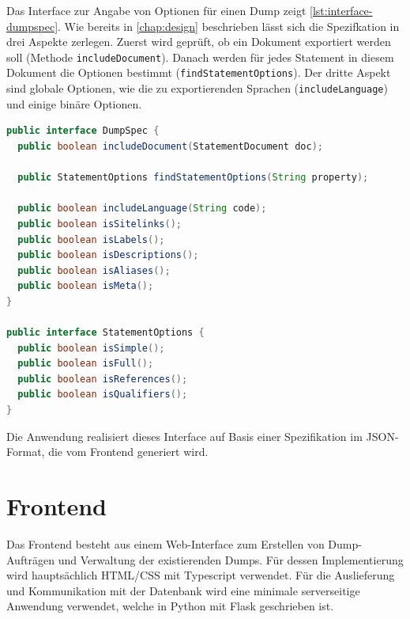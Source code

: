 Das Interface zur Angabe von Optionen für einen Dump zeigt \cref{lst:interface-dumpspec}.
Wie bereits in \cref{chap:design} beschrieben lässt sich die Spezifkation in drei Aspekte zerlegen.
Zuerst wird geprüft, ob ein Dokument exportiert werden soll (Methode \verb|includeDocument|).
Danach werden für jedes Statement in diesem Dokument die Optionen bestimmt (\verb|findStatementOptions|).
Der dritte Aspekt sind globale Optionen, wie die zu exportierenden Sprachen (\verb|includeLanguage|) und einige binäre Optionen.

\begin{lstlisting}[language=Java, caption={Interface für die Filterkriterien}, label={lst:interface-dumpspec}]
public interface DumpSpec {
  public boolean includeDocument(StatementDocument doc);

  public StatementOptions findStatementOptions(String property);

  public boolean includeLanguage(String code);
  public boolean isSitelinks();
  public boolean isLabels();
  public boolean isDescriptions();
  public boolean isAliases();
  public boolean isMeta();
}

public interface StatementOptions {
  public boolean isSimple();
  public boolean isFull();
  public boolean isReferences();
  public boolean isQualifiers();
}
\end{lstlisting}

Die Anwendung realisiert dieses Interface auf Basis einer Spezifikation im JSON-Format, die vom Frontend generiert wird. 

\section{Frontend}
Das Frontend besteht aus einem Web-Interface zum Erstellen von Dump-Aufträgen und Verwaltung der existierenden Dumps.
Für dessen Implementierung wird hauptsächlich HTML/CSS mit Typescript verwendet.
Für die Auslieferung und Kommunikation mit der Datenbank wird eine minimale serverseitige Anwendung verwendet, welche in Python mit Flask geschrieben ist.

